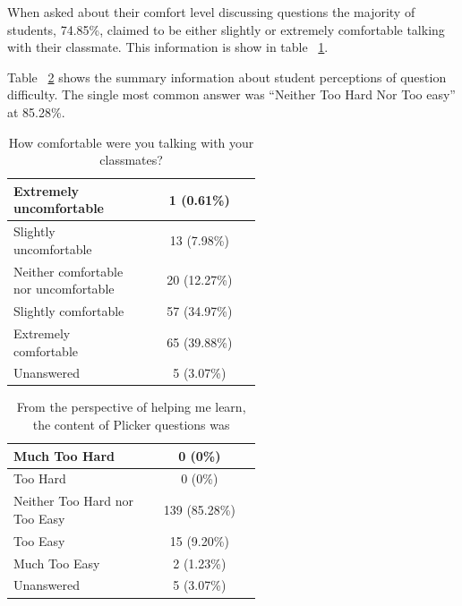 \documentclass[12pt]{article}
\begin{document}
When asked about their comfort level discussing questions the majority of students, 74.85\%, claimed to be either slightly or extremely comfortable talking with their classmate. This information is show in table ~\ref{table:group_comfort}.

Table ~\ref{table:questionDifficulty} shows the summary information about student perceptions of question difficulty. The single most common answer was ``Neither Too Hard Nor Too easy'' at 85.28\%. 


\begin{table}[ht]
\label{table:group_comfort}
\begin{tabular}{p{0.55\linewidth}|c} %
\toprule
 \rowcolor{LightGray} 
 Extremely uncomfortable & 1 (0.61\%)\\\midrule 
 Slightly uncomfortable & 13 (7.98\%)\\\midrule 
 \rowcolor{LightGray}
 Neither comfortable nor uncomfortable & 20 (12.27\%)\\\midrule 
 Slightly comfortable & 57 (34.97\%)\\\midrule 
 \rowcolor{LightGray}
 Extremely comfortable & 65 (39.88\%)\\\midrule 
 Unanswered & 5 (3.07\%)\\\bottomrule 
\end{tabular}
\caption{How comfortable were you talking with your classmates?}
\end{table}



\begin{table}[ht]
\label{table:questionDifficulty}
\begin{tabular}{p{0.55\linewidth}|c} %
 \rowcolor{LightGray} 
 Much Too Hard & 0 (0\%)\\\midrule 
 Too Hard & 0 (0\%)\\\midrule 
 \rowcolor{LightGray}
 Neither Too Hard nor Too Easy & 139 (85.28\%)\\\midrule 
 Too Easy & 15 (9.20\%)\\\midrule 
 \rowcolor{LightGray}
 Much Too Easy & 2 (1.23\%)\\\midrule 
 Unanswered & 5 (3.07\%)\\\bottomrule 
\end{tabular}
\caption{From the perspective of helping me learn, the content of Plicker questions was}
\end{table}
\end{document}

